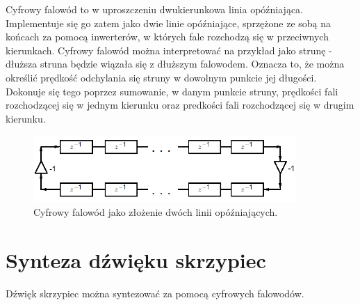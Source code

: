 
Cyfrowy falowód to w uproszczeniu dwukierunkowa linia opóźniająca. Implementuje się go zatem jako dwie linie opóźniające, sprzężone ze sobą na końcach za pomocą inwerterów, w których fale rozchodzą się w przeciwnych kierunkach. Cyfrowy falowód można interpretować na przykład jako strunę - dłuższa struna będzie wiązała się z dłuższym falowodem. Oznacza to, że można określić prędkość odchylania się struny w dowolnym punkcie jej długości. Dokonuje się tego poprzez sumowanie, w danym punkcie struny, prędkości fali rozchodzącej się w jednym kierunku oraz predkości fali rozchodzącej się w drugim kierunku.
\begin{figure}[H]
	\centering
	\includegraphics[width=10cm]{grafiki/model_falowod}
	\captionsetup{justification=centering}
	\caption{Cyfrowy falowód jako złożenie dwóch linii opóźniających.}
	\label{rys:model_falowod}
\end{figure}
\section{Synteza dźwięku skrzypiec}
Dźwięk skrzypiec można syntezować za pomocą cyfrowych falowodów. 

